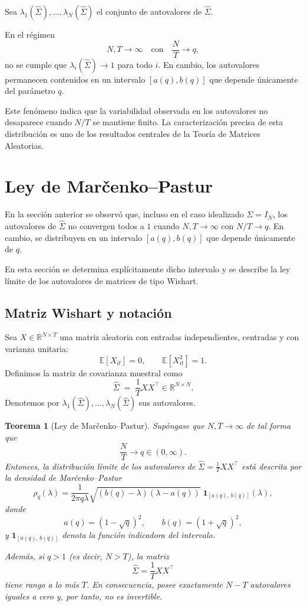 \documentclass[letterpaper,12pt,oneside]{book}
\newtheorem{theorem}{Teorema}[chapter]
\begin{document}
Sea $\lambda_1(\widehat{\Sigma}), \dots, 
\lambda_N(\widehat{\Sigma})$ el conjunto de autovalores de 
$\widehat{\Sigma}$. 

En el régimen
\[
N,T \to \infty \quad \text{con} \quad \frac{N}{T} \to q,
\]
no se cumple que $\lambda_i(\widehat{\Sigma}) \to 1$ 
para todo $i$. En cambio, los autovalores permanecen contenidos 
en un intervalo $[a(q), b(q)]$ que depende únicamente del 
parámetro $q$.

Este fenómeno indica que la variabilidad observada en los autovalores no desaparece cuando $N/T$ se mantiene finito. La caracterización precisa de esta distribución es uno de los resultados centrales de la Teoría de Matrices Aleatorias.

\section{Ley de Marčenko--Pastur}

En la sección anterior se observó que, incluso en el caso idealizado $\Sigma = I_N$,
los autovalores de $\widehat{\Sigma}$ no convergen todos a $1$ cuando 
$N,T \to \infty$ con $N/T \to q$. En cambio, se distribuyen en un intervalo
$[a(q), b(q)]$ que depende únicamente de $q$.

En esta sección se determina explícitamente dicho intervalo y se describe la ley límite
de los autovalores de matrices de tipo Wishart.

\subsection*{Matriz Wishart y notación}

Sea $X \in \mathbb{R}^{N \times T}$ una matriz aleatoria con entradas independientes,
centradas y con varianza unitaria:
\[
\mathbb{E}[X_{it}] = 0,
\qquad
\mathbb{E}[X_{it}^2] = 1.
\]
Definimos la matriz de covarianza muestral como
\[
\widehat{\Sigma} \;=\; \frac{1}{T}XX^\top \in \mathbb{R}^{N \times N}.
\]
Denotemos por $\lambda_1(\widehat{\Sigma}),\dots,\lambda_N(\widehat{\Sigma})$
sus autovalores.

\begin{theorem}[Ley de Marčenko--Pastur]
Supóngase que $N,T \to \infty$ de tal forma que
\[
\frac{N}{T} \to q \in (0,\infty).
\]
Entonces, la distribución límite de los autovalores de $\widehat{\Sigma} = \frac{1}{T}XX^\top$
está descrita por la densidad de Marčenko--Pastur
\[
\rho_q(\lambda)
=
\frac{1}{2\pi q \lambda}
\sqrt{(b(q)-\lambda)(\lambda-a(q))}
\;\mathbf{1}_{[a(q),\,b(q)]}(\lambda),
\]
donde
\[
a(q) = (1-\sqrt{q})^2,
\qquad
b(q) = (1+\sqrt{q})^2,
\]
y $\mathbf{1}_{[a(q),\,b(q)]}$ denota la función indicadora del intervalo.

Además, si $q>1$ (es decir, $N>T$), la matriz
\[
\widehat{\Sigma} = \frac{1}{T}XX^\top
\]
tiene rango a lo más $T$. En consecuencia, posee exactamente $N-T$ autovalores iguales a cero y, por tanto, no es invertible.
\end{theorem}
\end{document}
